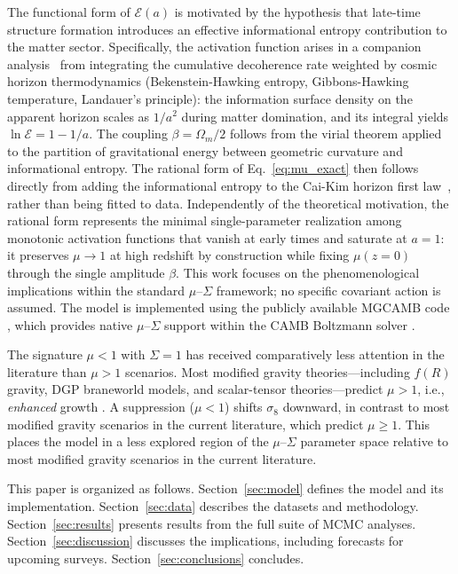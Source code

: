 \documentclass[11pt]{article}
\begin{document}
The functional form of $\mathcal{E}(a)$ is motivated by the hypothesis that late-time structure formation introduces an effective informational entropy contribution to the matter sector.
Specifically, the activation function arises in a companion analysis~\citep{Mahaffey2026theory} from integrating the cumulative decoherence rate weighted by cosmic horizon thermodynamics (Bekenstein-Hawking entropy, Gibbons-Hawking temperature, Landauer's principle): the information surface density on the apparent horizon scales as $1/a^2$ during matter domination, and its integral yields $\ln\mathcal{E} = 1 - 1/a$.
The coupling $\beta = \Omega_m/2$ follows from the virial theorem applied to the partition of gravitational energy between geometric curvature and informational entropy.
The rational form of Eq.~\eqref{eq:mu_exact} then follows directly from adding the informational entropy to the Cai-Kim horizon first law~\citep{Mahaffey2026theory}, rather than being fitted to data.
Independently of the theoretical motivation, the rational form represents the minimal single-parameter realization among monotonic activation functions that vanish at early times and saturate at $a = 1$: it preserves $\mu \to 1$ at high redshift by construction while fixing $\mu(z{=}0)$ through the single amplitude $\beta$.
This work focuses on the phenomenological implications within the standard $\mu$--$\Sigma$ framework; no specific covariant action is assumed.
The model is implemented using the publicly available MGCAMB code \citep{MGCAMB}, which provides native $\mu$--$\Sigma$ support within the CAMB Boltzmann solver \citep{CAMB}.

The signature $\mu < 1$ with $\Sigma = 1$ has received comparatively less attention in the literature than $\mu > 1$ scenarios.
Most modified gravity theories---including $f(R)$ gravity, DGP braneworld models, and scalar-tensor theories---predict $\mu > 1$, i.e., \emph{enhanced} growth \citep{PogosianSilvestri2016}.
A suppression ($\mu < 1$) shifts $\sigma_8$ downward, in contrast to most modified gravity scenarios in the current literature, which predict $\mu \geq 1$.
This places the model in a less explored region of the $\mu$--$\Sigma$ parameter space relative to most modified gravity scenarios in the current literature.

This paper is organized as follows.
Section~\ref{sec:model} defines the model and its implementation.
Section~\ref{sec:data} describes the datasets and methodology.
Section~\ref{sec:results} presents results from the full suite of MCMC analyses.
Section~\ref{sec:discussion} discusses the implications, including forecasts for upcoming surveys.
Section~\ref{sec:conclusions} concludes.
\end{document}
